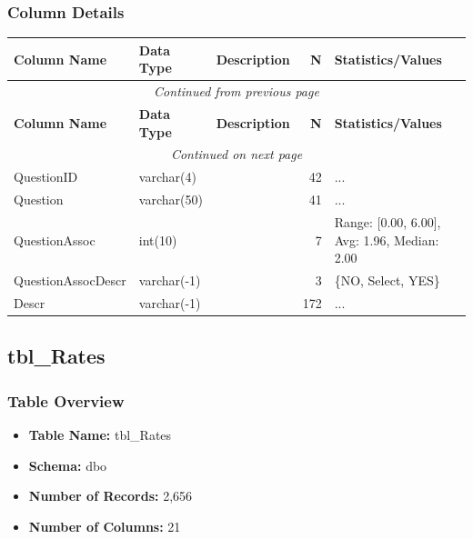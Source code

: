 \begin{landscape}
\subsubsection{Column Details}
\begin{longtable}{|l|l|l|r|p{6cm}|}
\hline
\textbf{Column Name} & \textbf{Data Type} & \textbf{Description} & \textbf{N} & \textbf{Statistics/Values} \\
\hline
\endfirsthead
\multicolumn{5}{c}{\textit{Continued from previous page}} \\
\hline
\textbf{Column Name} & \textbf{Data Type} & \textbf{Description} & \textbf{N} & \textbf{Statistics/Values} \\
\hline
\endhead
\hline
\multicolumn{5}{c}{\textit{Continued on next page}} \\
\endfoot
\hline
\endlastfoot
QuestionID & varchar(4) &  & 42 & ... \\
\hline
Question & varchar(50) &  & 41 & ... \\
\hline
QuestionAssoc & int(10) &  & 7 & Range: [0.00, 6.00], Avg: 1.96, Median: 2.00 \\
\hline
QuestionAssocDescr & varchar(-1) &  & 3 & \{NO, Select, YES\} \\
\hline
Descr & varchar(-1) &  & 172 & ... \\
\hline
\end{longtable}

\subsection{tbl\_Rates}

\subsubsection{Table Overview}
\begin{itemize}
\item \textbf{Table Name:} tbl\_Rates
\item \textbf{Schema:} dbo
\item \textbf{Number of Records:} 2,656
\item \textbf{Number of Columns:} 21
\end{itemize}


\end{landscape}
